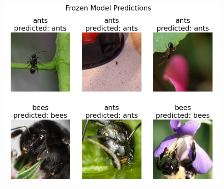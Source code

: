\documentclass[12 pt]{article}        	%
\begin{document}
\begin{figure}[h!]
  \includegraphics[width=0.6\linewidth]{tl_frozen.png}
\end{figure}
\end{document}
